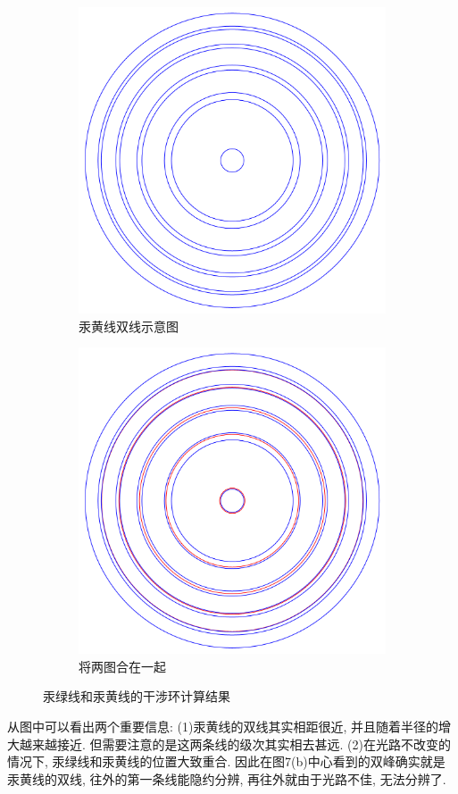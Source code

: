 \documentclass[12pt,a4paper]{article}
\begin{document}
\begin{figure}[H]
\begin{subfigure}[b]{0.32\textwidth}
      \includegraphics[width=\textwidth]{calc_y}
      \caption{汞黄线双线示意图}
    \end{subfigure}
    \hfill
    \begin{subfigure}[b]{0.32\textwidth}
      \centering
      \includegraphics[width=\textwidth]{calc_yg}
      \caption{将两图合在一起}
    \end{subfigure}
    \caption{汞绿线和汞黄线的干涉环计算结果}
  \end{figure}
从图中可以看出两个重要信息: (1)汞黄线的双线其实相距很近, 并且随着半径的增大越来越接近. 但需要注意的是这两条线的级次其实相去甚远. (2)在光路不改变的情况下, 汞绿线和汞黄线的位置大致重合. 
因此在图7(b)中心看到的双峰确实就是汞黄线的双线, 往外的第一条线能隐约分辨, 再往外就由于光路不佳, 无法分辨了. 
\end{document}
